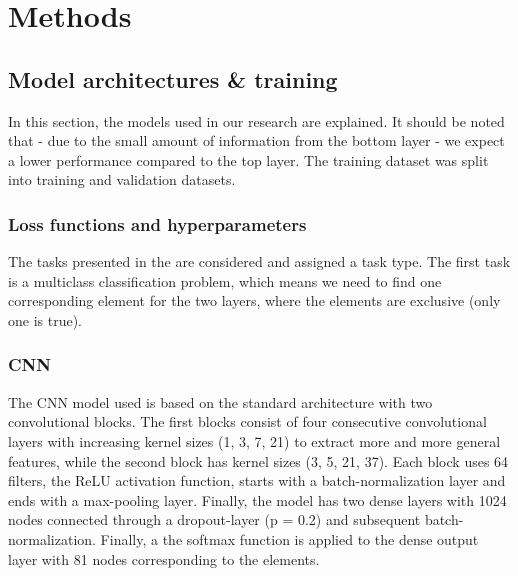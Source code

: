 
\chapter{Methods} %

\label{Chapter3} %







\section{Model architectures \& training}
In this section, the models used in our research are explained.
It should be noted that - due to the small amount of information from the bottom layer - we expect a lower performance compared to the top layer.
The training dataset was split into training and validation datasets.

\subsection{Loss functions and hyperparameters}
The tasks presented in the  are considered and assigned a task type.
The first task is a multiclass classification problem, which means we need to find one corresponding element for the two layers, where the elements are exclusive (only one is true).

\subsection{CNN}
The CNN model used is based on the standard architecture with two convolutional blocks. The first blocks consist of four consecutive convolutional layers with increasing kernel sizes (1, 3, 7, 21) to extract more and more general features, while the second block has kernel sizes (3, 5, 21, 37). Each block uses 64 filters, the ReLU activation function, starts with a batch-normalization layer and ends with a max-pooling layer. Finally, the model has two dense layers with 1024 nodes connected through a dropout-layer (p = 0.2) and subsequent batch-normalization. Finally, a the softmax function is applied to the dense output layer with 81 nodes corresponding to the elements.

